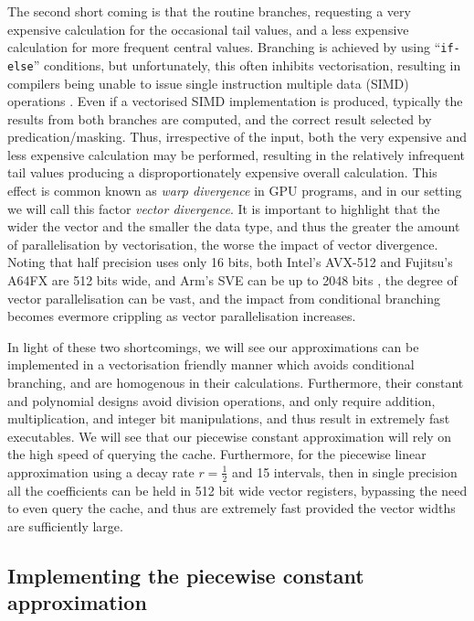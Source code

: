 \documentclass[manuscript,review]{acmart}
\begin{document}
The second short coming is that the routine branches, requesting a very expensive calculation for the occasional tail values, and a less expensive calculation for more frequent central values. Branching is achieved by using ``\texttt{if-else}'' conditions, but unfortunately, this often inhibits vectorisation, resulting in compilers being unable to issue single instruction multiple data (SIMD) operations \citep{vanderpas2017using}. Even if a vectorised SIMD implementation is produced, typically the results from both branches are computed, and the correct result selected by predication/masking. Thus, irrespective of the input, both the very expensive and less expensive calculation may be performed, resulting in the relatively infrequent tail values producing a disproportionately expensive overall calculation. This effect is common known as \emph{warp divergence} in GPU programs, and in our setting we will call this factor \emph{vector divergence}. It is important to highlight that the wider the vector and the smaller the data type, and thus the greater the amount of parallelisation by vectorisation, the worse the impact of vector divergence. Noting that half precision uses only 16 bits, both Intel's AVX-512 and Fujitsu's A64FX are 512 bits wide, and Arm's SVE can be up to 2048 bits \citep{petrogalli2016sneak_peak,stephens2017arm}, the degree of vector parallelisation can be vast, and the impact from conditional branching becomes evermore crippling as vector parallelisation increases. 

In light of these two shortcomings, we will see our approximations can be implemented in a vectorisation friendly manner which avoids conditional branching, and are homogenous in their calculations. Furthermore, their constant and polynomial designs avoid division operations, and only require addition, multiplication, and integer bit manipulations, and thus result in extremely fast executables. We will see that our piecewise constant approximation will rely on the high speed of querying the cache. Furthermore, for the piecewise linear approximation using a decay rate $ r = \tfrac{1}{2} $ and 15 intervals, then in single precision all the coefficients can be held in 512 bit wide vector registers, bypassing the need to even query the cache, and thus are extremely fast provided the vector widths are sufficiently large. 

\subsection{Implementing the piecewise constant approximation}
\end{document}
